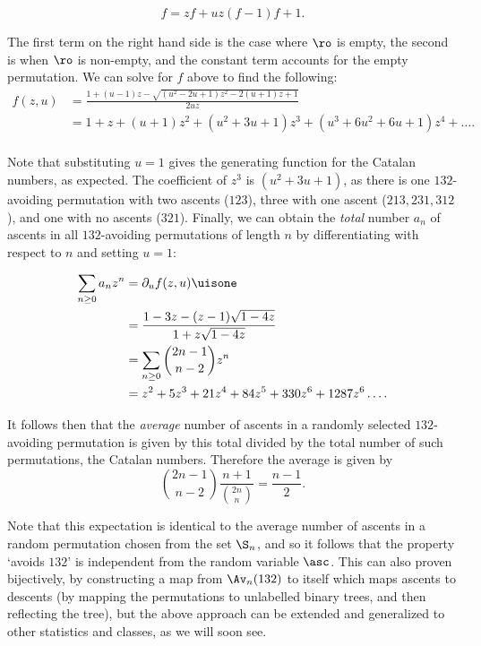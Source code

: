 \documentclass[12pt,twoside]{memoir}
\begin{document}
      $$ f = zf + uz(f - 1) f + 1.$$

      The first term on the right hand side is the case where $\ro$ is empty, the
      second is when $\ro$ is non-empty, and the constant term accounts for the
      empty permutation. We can solve for $f$ above to find the following:
      $$ \begin{aligned}
      f(z,u) &= \frac{1 + (u-1)z - \sqrt{(u^2 - 2u + 1)z^2 - 2(u+1)z + 1}}{2uz} \\
        &= 1 + z + (u+1)z^2 + (u^2 + 3u + 1)z^3 + (u^3 + 6u^2 + 6u + 1)z^4 +
        \dots. \\
        \end{aligned} $$

      Note that substituting $u=1$ gives the generating function for the Catalan
      numbers, as expected. The coefficient of $z^3$ is $(u^2 + 3u + 1)$, as
      there is one $132$-avoiding permutation with two ascents ($123$), three
      with one ascent ($213, 231, 312$), and one with no ascents ($321$).
      Finally, we can obtain the \emph{total} number $a_n$ of ascents in all
      $132$-avoiding permutations of length $n$ by differentiating with respect to $n$ and
      setting $u=1$:

      $$ \begin{aligned} 
         \sum_{n \geq 0} a_n z^n  &= \partial_u f(z,u) \uisone \\
         &= \frac{1 - 3z - (z - 1)\sqrt{1 - 4z}}{1 + z\sqrt{1 - 4z}} \\
         &= \sum_{n \geq 0} \binom{2n-1}{n-2} z^n \\
         &= z^2 + 5z^3 + 21z^4 + 84z^5 + 330 z^6 + 1287z^6 \dots .
      \end{aligned} $$
      
      It follows then that the \emph{average} number of ascents in a randomly
      selected $132$-avoiding permutation is given by this total divided by
      the total number of such permutations, the Catalan numbers. Therefore the
      average is given by 
      $$ \binom{2n-1}{n-2} \frac{n+1}{\binom{2n}{n}} = \frac{n-1}{2}.$$

      Note that this expectation is identical to the average number of ascents in
      a random permutation chosen from the set $\S_n$, and so it follows that
      the property `avoids $132$' is independent from the random variable $\asc$.
      This can also proven bijectively, by constructing a map from
      $\Av_n(132)$ to itself which maps ascents to descents (by mapping the
      permutations to unlabelled binary trees, and then reflecting the tree), but
      the above approach can be extended and generalized to other statistics and
      classes, as we will soon see. 
      
\end{document}
